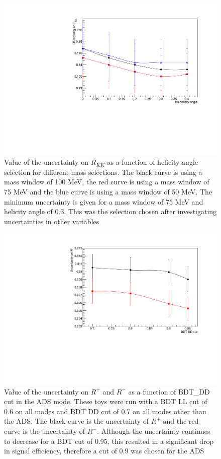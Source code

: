 \begin{figure}
\includegraphics[width=\linewidth]{figures/selection/optimisation.pdf}
\caption{Value of the uncertainty on $R_{KK}$ as a function of \KS helicity angle selection for different \Kstar mass selections. The black curve is using a \Kstar mass window of 100 MeV, the red curve is using a \Kstar mass window of 75 MeV and the blue curve is using a \Kstar mass window of 50 MeV. The minimum uncertainty is given for a \Kstar mass window of 75 MeV and \KS helicity angle of 0.3. This was the \Kstar selection chosen after investigating uncertainties in other variables}
\label{optimisation}
\end{figure}

\begin{figure}
\includegraphics[width=\linewidth]{figures/selection/ADSoptimisation.pdf}
\caption{Value of the uncertainty on $R^+$ and $R^-$ as a function of BDT\_DD cut in the ADS mode. These toys were run with a BDT LL cut of 0.6 on all modes and BDT DD cut of 0.7 on all modes other than the ADS. The black curve is the uncertainty of $R^+$ and the red curve is the uncertainty of $R^-$. Although the uncertainty continues to decrease for a BDT cut of 0.95, this resulted in a significant drop in signal efficiency, therefore a cut of 0.9 was chosen for the ADS}
\label{adsoptimisation}
\end{figure}

